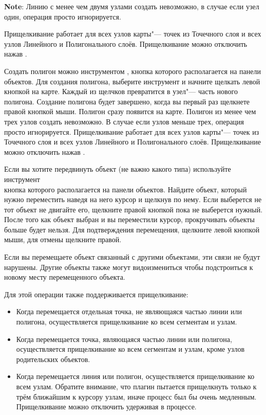\textbf{Note}: Линию с менее чем двумя узлами создать невозможно, в
случае если узел один, операция просто игнорируется.

Прищелкивание работает для всех узлов карты"--- точек из Точечного слоя
и всех узлов Линейного и Полигонального слоёв. Прищелкивание можно
отключить нажав .


Создать полигон можно инструментом ,
кнопка которого располагается на панели объектов. Для создания полигона,
выберите инструмент и начните щелкать левой кнопкой на карте. Каждый из
щелчков превратится в узел"--- часть нового полигона. Создание полигона
будет завершено, когда вы первый раз щелкнете правой кнопкой мыши.
Полигон сразу появится на карте. Полигон из менее чем трех узлов создать
невозможно. В случае если узлов меньше трех, операция просто
игнорируется. Прищелкивание работает для всех узлов карты"--- точек из
Точечного слоя и всех узлов Линейного и Полигонального слоёв.
Прищелкивание можно отключить нажав .


Если вы хотите передвинуть объект (не важно какого типа) используйте
инструмент \\
 кнопка которого
располагается на панели объектов. Найдите объект, который нужно
переместить наведя на него курсор и щелкнув по нему. Если выберется не
тот объект не двигайте его, щелкните правой кнопкой пока не выберется
нужный. После того как объект выбран и вы переместили курсор,
прокручивать объекты больше будет нельзя. Для подтверждения перемещения,
щелкните левой кнопкой мыши, для отмены щелкните правой.

Если вы перемещаете объект связанный с другими объектами, эти связи не
будут нарушены. Другие объекты также могут видоизмениться чтобы
подстроиться к новому месту перемещенного объекта.

Для этой операции также поддерживается прищелкивание:

\begin{itemize}[label=--]
\item Когда перемещается отдельная точка, не являющаяся частью линии или
полигона, осуществляется прищелкивание ко всем сегментам и узлам.
\item Когда перемещается точка, являющаяся частью линии или полигона,
осуществляется прищелкивание ко всем сегментам и узлам, кроме узлов
родительских объектов.
\item Когда перемещается линия или полигон, осуществляется прищелкивание
ко всем узлам. Обратите внимание, что плагин пытается прищелкнуть только
к трём ближайшим к курсору узлам, иначе процесс был бы очень медленным.
Прищелкивание можно отключить удерживая  в процессе.
\end{itemize}

